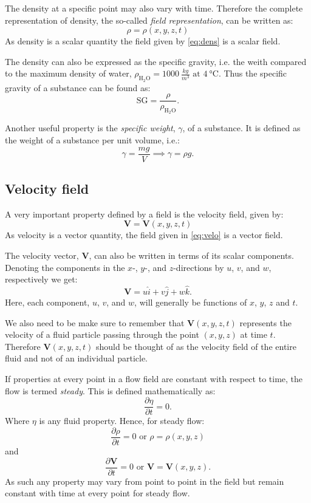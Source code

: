 The density at a specific point may also vary with time. Therefore the complete representation of density, the so-called \textit{field representation}, can be written as:
\begin{equation} \label{eq:dens}
\rho = \rho(x,y,z,t)
\end{equation}
As density is a scalar quantity the field given by \autoref{eq:dens} is a scalar field. 

The density can also be expressed as the specific gravity, i.e. the weith compared to the maximum density of water, $\rho_{\mathrm{H}_2 \mathrm{O}} = \qty{1000}{\frac{kg}{m^3}} \text{ at } \qty{4}{\celsius} $. Thus the specific gravity of a substance can be found as:
\[ 
\mathrm{SG} = \frac{\rho}{\rho_{\mathrm{H}_2 \mathrm{O}}}
.\]

Another useful property is the \textit{specific weight}, $\gamma$, of a substance. It is defined as the weight of a substance per unit volume, i.e.:
\[ 
\gamma = \frac{mg}{V} \implies \gamma = \rho g
.\]

\subsection{Velocity field}
A very important property defined by a field is the velocity field, given by:
\begin{equation} \label{eq:velo}
  \textbf{V} = \textbf{V}(x, y, z, t)
\end{equation}
As velocity is a vector quantity, the field given in \autoref{eq:velo} is a vector field.

The velocity vector, $\textbf{V}$, can also be written in terms of its scalar components. Denoting the components in the $x$-, $y$-, and $z$-directions by $u$, $v$, and $w$, respectively we get:
\[ 
\textbf{V} = u \hat{i} + v \hat{j} + w \hat{k}
.\]
Here, each component, $u$, $v$, and $w$, will generally be functions of $x$, $y$, $z$ and $t$.

We also need to be make sure to remember that $\textbf{V}(x, y, z, t)$ represents the velocity of a fluid particle passing through the point $(x,y,z)$ at time $t$. Therefore $\textbf{V}(x,y,z,t)$ should be thought of as the velocity field of the entire fluid and not of an individual particle.

If properties at every point in a flow field are constant with respect to time, the flow is termed \textit{steady}. This is defined mathematically as:
\[ 
\frac{\partial \eta}{\partial t} = 0
.\]
Where $\eta$ is any fluid property. Hence, for steady flow:
\[ 
\frac{\partial \rho}{\partial t} = 0 \text{ or } \rho = \rho(x,y,z)
\]
and
\[ 
\frac{\partial \textbf{V}}{\partial t} = 0 \text{ or } \textbf{V} = \textbf{V}(x,y,z)
.\]
As such any property may vary from point to point in the field but remain constant with time at every point for steady flow. 



